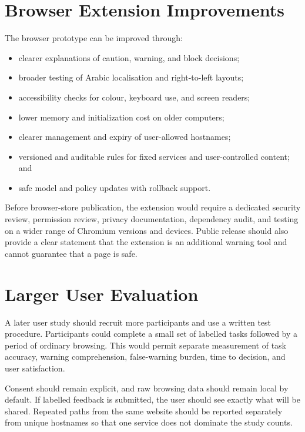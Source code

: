 \section{Browser Extension Improvements}

The browser prototype can be improved through:

\begin{itemize}
\item clearer explanations of caution, warning, and block decisions;
\item broader testing of Arabic localisation and right-to-left layouts;
\item accessibility checks for colour, keyboard use, and screen readers;
\item lower memory and initialization cost on older computers;
\item clearer management and expiry of user-allowed hostnames;
\item versioned and auditable rules for fixed services and user-controlled
content; and
\item safe model and policy updates with rollback support.
\end{itemize}

Before browser-store publication, the extension would require a dedicated
security review, permission review, privacy documentation, dependency audit,
and testing on a wider range of Chromium versions and devices. Public release
should also provide a clear statement that the extension is an additional
warning tool and cannot guarantee that a page is safe.

\section{Larger User Evaluation}

A later user study should recruit more participants and use a written test
procedure. Participants could complete a small set of labelled tasks followed
by a period of ordinary browsing. This would permit separate measurement of
task accuracy, warning comprehension, false-warning burden, time to decision,
and user satisfaction.

Consent should remain explicit, and raw browsing data should remain local by
default. If labelled feedback is submitted, the user should see exactly what
will be shared. Repeated paths from the same website should be reported
separately from unique hostnames so that one service does not dominate the
study counts.

